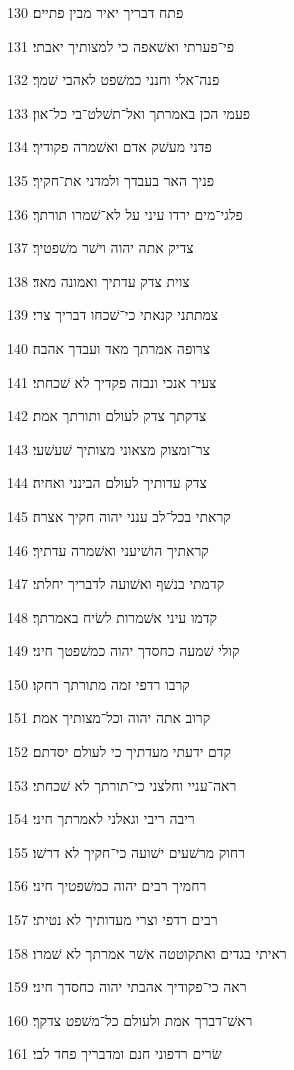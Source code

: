 \par 130 פתח דבריך יאיר מבין פתיים׃
\par 131 פי־פערתי ואשׁאפה כי למצותיך יאבתי׃
\par 132 פנה־אלי וחנני כמשׁפט לאהבי שׁמך׃
\par 133 פעמי הכן באמרתך ואל־תשׁלט־בי כל־און׃
\par 134 פדני מעשׁק אדם ואשׁמרה פקודיך׃
\par 135 פניך האר בעבדך ולמדני את־חקיך׃
\par 136 פלגי־מים ירדו עיני על לא־שׁמרו תורתך׃
\par 137 צדיק אתה יהוה וישׁר משׁפטיך׃
\par 138 צוית צדק עדתיך ואמונה מאד׃
\par 139 צמתתני קנאתי כי־שׁכחו דבריך צרי׃
\par 140 צרופה אמרתך מאד ועבדך אהבה׃
\par 141 צעיר אנכי ונבזה פקדיך לא שׁכחתי׃
\par 142 צדקתך צדק לעולם ותורתך אמת׃
\par 143 צר־ומצוק מצאוני מצותיך שׁעשׁעי׃
\par 144 צדק עדותיך לעולם הבינני ואחיה׃
\par 145 קראתי בכל־לב ענני יהוה חקיך אצרה׃
\par 146 קראתיך הושׁיעני ואשׁמרה עדתיך׃
\par 147 קדמתי בנשׁף ואשׁועה לדבריך יחלתי׃
\par 148 קדמו עיני אשׁמרות לשׂיח באמרתך׃
\par 149 קולי שׁמעה כחסדך יהוה כמשׁפטך חיני׃
\par 150 קרבו רדפי זמה מתורתך רחקו׃
\par 151 קרוב אתה יהוה וכל־מצותיך אמת׃
\par 152 קדם ידעתי מעדתיך כי לעולם יסדתם׃
\par 153 ראה־עניי וחלצני כי־תורתך לא שׁכחתי׃
\par 154 ריבה ריבי וגאלני לאמרתך חיני׃
\par 155 רחוק מרשׁעים ישׁועה כי־חקיך לא דרשׁו׃
\par 156 רחמיך רבים יהוה כמשׁפטיך חיני׃
\par 157 רבים רדפי וצרי מעדותיך לא נטיתי׃
\par 158 ראיתי בגדים ואתקוטטה אשׁר אמרתך לא שׁמרו׃
\par 159 ראה כי־פקודיך אהבתי יהוה כחסדך חיני׃
\par 160 ראשׁ־דברך אמת ולעולם כל־משׁפט צדקך׃
\par 161 שׂרים רדפוני חנם ומדבריך פחד לבי׃
